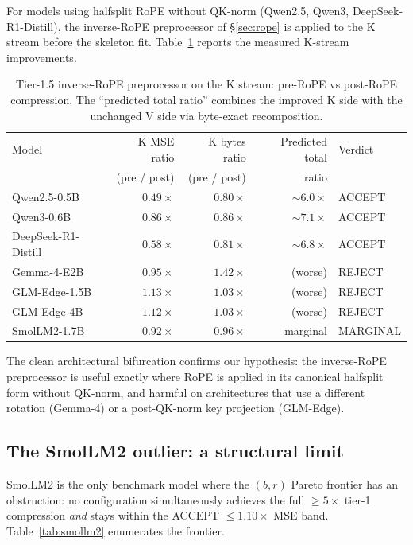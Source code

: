 \documentclass[11pt,a4paper]{article}
\theoremstyle{definition}
\theoremstyle{plain}
\begin{document}
For models using halfsplit RoPE without QK-norm (Qwen2.5, Qwen3, DeepSeek-R1-Distill), the inverse-RoPE preprocessor of \S\ref{sec:rope} is applied to the K stream before the skeleton fit. Table~\ref{tab:rope} reports the measured K-stream improvements.

\begin{table}[H]
\centering
\small
\caption{Tier-1.5 inverse-RoPE preprocessor on the K stream: pre-RoPE vs post-RoPE compression. The ``predicted total ratio'' combines the improved K side with the unchanged V side via byte-exact recomposition.}
\label{tab:rope}
\begin{tabular}{lrrrl}
  \toprule
  Model & K MSE ratio & K bytes ratio & Predicted total & Verdict \\
  & (pre / post) & (pre / post) & ratio & \\
  \midrule
  Qwen2.5-0.5B      & $0.49\times$ & $0.80\times$ & $\sim 6.0\times$ & ACCEPT \\
  Qwen3-0.6B        & $0.86\times$ & $0.86\times$ & $\sim 7.1\times$ & ACCEPT \\
  DeepSeek-R1-Distill & $0.58\times$ & $0.81\times$ & $\sim 6.8\times$ & ACCEPT \\
  \midrule
  Gemma-4-E2B       & $0.95\times$ & $1.42\times$ & (worse) & REJECT \\
  GLM-Edge-1.5B     & $1.13\times$ & $1.03\times$ & (worse) & REJECT \\
  GLM-Edge-4B       & $1.12\times$ & $1.03\times$ & (worse) & REJECT \\
  SmolLM2-1.7B      & $0.92\times$ & $0.96\times$ & marginal & MARGINAL \\
  \bottomrule
\end{tabular}
\end{table}

The clean architectural bifurcation confirms our hypothesis: the inverse-RoPE preprocessor is useful exactly where RoPE is applied in its canonical halfsplit form without QK-norm, and harmful on architectures that use a different rotation (Gemma-4) or a post-QK-norm key projection (GLM-Edge).

\subsection{The SmolLM2 outlier: a structural limit}
\label{sec:smollm2}

SmolLM2 is the only benchmark model where the $(b, r)$ Pareto frontier has an obstruction: no configuration simultaneously achieves the full $\ge 5\times$ tier-1 compression \emph{and} stays within the ACCEPT $\le 1.10\times$ MSE band. Table~\ref{tab:smollm2} enumerates the frontier.
\end{document}
